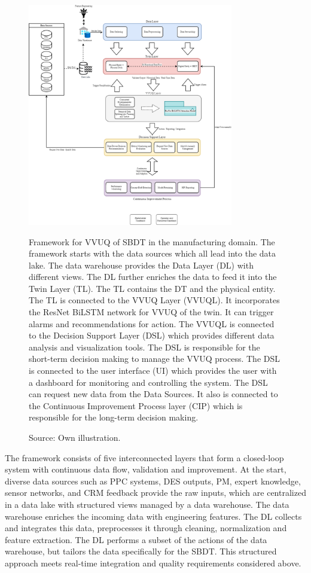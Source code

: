 \begin{figure}[htbp]
  \centering
  \includegraphics[width=0.8\textwidth]{figures/framework.png}
  \caption[The thesis VVUQ framework]{Framework for VVUQ of SBDT in the manufacturing domain. The framework starts with the data sources which all lead into the data lake. The data warehouse provides the Data Layer (DL) with different views. The DL further enriches the data to feed it into the Twin Layer (TL). The TL contains the DT and the physical entity. The TL is connected to the VVUQ Layer (VVUQL). It incorporates the ResNet BiLSTM network for VVUQ of the twin. It can trigger alarms and recommendations for action. The VVUQL is connected to the Decision Support Layer (DSL) which provides different data analysis and visualization tools. The DSL is responsible for the short-term decision making to manage the VVUQ process. The DSL is connected to the user interface (UI) which provides the user with a dashboard for monitoring and controlling the system. The DSL can request new data from the Data Sources. It also is connected to the Continuous Improvement Process layer (CIP) which is responsible for the long-term decision making.}
  \caption*{Source: Own illustration.}
  \label{fig:framework}
\end{figure}

The framework consists of five interconnected layers that form a closed-loop system with continuous data flow, validation and improvement. At the start, diverse data sources such as PPC systems, DES outputs, PM, expert knowledge, sensor networks, and CRM feedback provide the raw inputs, which are centralized in a data lake with structured views managed by a data warehouse. The data warehouse enriches the incoming data with engineering features. The DL collects and integrates this data, preprocesses it through cleaning, normalization and feature extraction. The DL performs a subset of the actions of the data warehouse, but tailors the data specifically for the SBDT. This structured approach meets real-time integration and quality requirements considered above.

